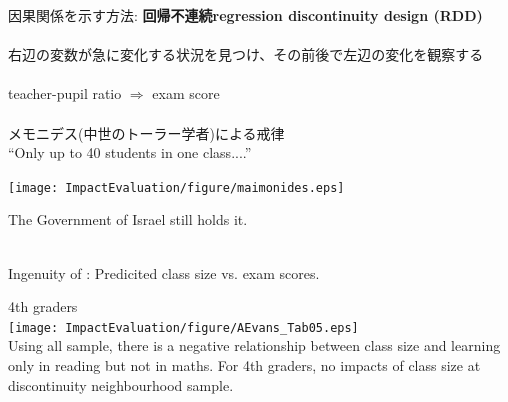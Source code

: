 \begin{frame}{}
因果関係を示す方法: \textbf{回帰不連続regression discontinuity design (RDD)}\\~\\
\pause
右辺の変数が急に変化する状況を見つけ、その前後で左辺の変化を観察する\\~\\
\pause
teacher-pupil ratio $\Rightarrow$ exam score\\~\\
\pause
メモニデス(中世のトーラー学者)による戒律\\
\pause
``Only up to 40 students in one class....''\\
\pause
\hfil{}
\end{frame}

\begin{frame}{}
\hfil\texttt{[image: ImpactEvaluation/figure/maimonides.eps]}
\end{frame}

\begin{frame}{}
The Government of Israel still holds it. \\
\pause
\hfil{}\\
\end{frame}

\begin{frame}{}
Ingenuity of \citet{AngristLavy1999}: Predicited class size vs. exam scores.\\
\end{frame}

\begin{frame}[t]{}
4th graders\\
\hfil\texttt{[image: ImpactEvaluation/figure/AEvans\_Tab05.eps]}\\
Using all sample, there is a negative relationship between class size and learning only in reading but not in maths. For 4th graders, no impacts of class size at discontinuity neighbourhood sample.\\
\vspace{-4.9cm}\hspace{3.4cm}
\end{frame}

